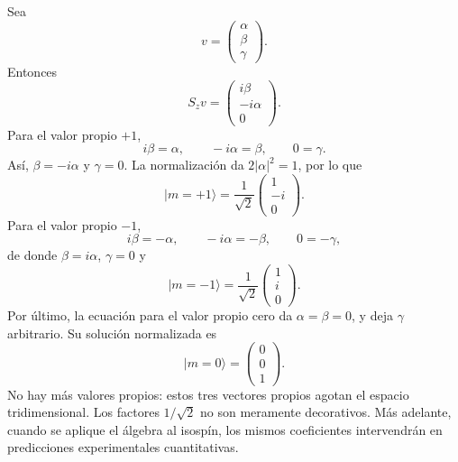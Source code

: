 Sea
\begin{equation}
v=
\begin{pmatrix}
\alpha\\
\beta\\
\gamma
\end{pmatrix}.
\end{equation}
Entonces
\begin{equation}
S_zv
=
\begin{pmatrix}
i\beta\\
-i\alpha\\
0
\end{pmatrix}.
\end{equation}
Para el valor propio \(+1\),
\begin{equation}
i\beta=\alpha,
\qquad
-i\alpha=\beta,
\qquad
0=\gamma.
\end{equation}
Así, \(\beta=-i\alpha\) y \(\gamma=0\). La normalización da \(2|\alpha|^2=1\), por lo que
\begin{equation}
|m=+1\rangle
=
\frac{1}{\sqrt2}
\begin{pmatrix}
1\\
-i\\
0
\end{pmatrix}.
\end{equation}
Para el valor propio \(-1\),
\begin{equation}
i\beta=-\alpha,
\qquad
-i\alpha=-\beta,
\qquad
0=-\gamma,
\end{equation}
de donde \(\beta=i\alpha\), \(\gamma=0\) y
\begin{equation}
|m=-1\rangle
=
\frac{1}{\sqrt2}
\begin{pmatrix}
1\\
i\\
0
\end{pmatrix}.
\end{equation}
Por último, la ecuación para el valor propio cero da \(\alpha=\beta=0\), y deja \(\gamma\) arbitrario. Su solución normalizada es
\begin{equation}
|m=0\rangle
=
\begin{pmatrix}
0\\
0\\
1
\end{pmatrix}.
\end{equation}
No hay más valores propios: estos tres vectores propios agotan el espacio tridimensional. Los factores \(1/\sqrt2\) no son meramente decorativos. Más adelante, cuando se aplique el álgebra al isospín, los mismos coeficientes intervendrán en predicciones experimentales cuantitativas.

